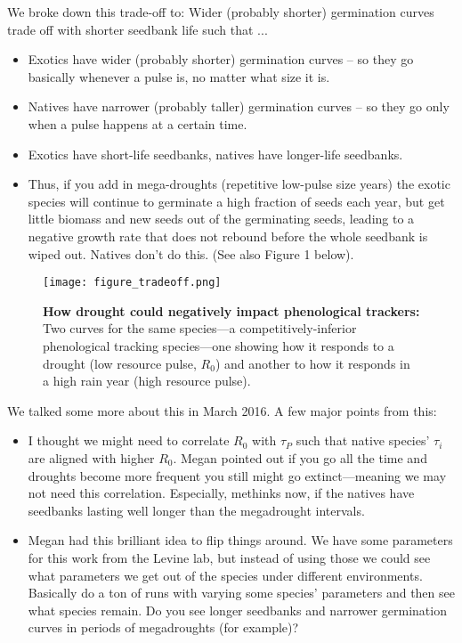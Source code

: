 \documentclass[11pt,a4paper,oneside]{article}
\newenvironment{smitemize}{
\begin{itemize}
  \setlength{\itemsep}{1pt}
  \setlength{\parskip}{0pt}
  \setlength{\parsep}{0pt}}
{\end{itemize}
}
\begin{document}
\noindent We broke down this trade-off to: Wider (probably shorter) germination curves trade off with shorter seedbank life such that ...
\begin{smitemize}
\item Exotics have wider (probably shorter) germination curves -- so they go basically whenever a pulse is, no matter what size it is.
\item Natives have narrower (probably taller) germination curves -- so they go only when a pulse happens at a certain time.
\item Exotics have short-life seedbanks, natives have longer-life seedbanks. 
\item Thus, if you add in mega-droughts (repetitive low-pulse size years) the exotic species will continue to germinate a high fraction of seeds each year, but get little biomass and new seeds out of the germinating seeds, leading to a negative growth rate that does not rebound before the whole seedbank is wiped out. Natives don't do this. (See also Figure 1 below). 
\end{smitemize}

\begin{figure}[h!]
\centering
\noindent \texttt{[image: figure\_tradeoff.png]}
\caption{{\bf How drought could negatively impact phenological trackers:} Two curves for the same species---a competitively-inferior phenological tracking species---one showing how it responds to a drought (low resource pulse, $R_0$) and another to how it responds in a high rain year (high resource pulse).} %
\end{figure}

We talked some more about this in March 2016. A few major points from this:
\begin{smitemize}
\item I thought we might need to correlate $R_0$ with $\tau_{P}$ such that native species' $\tau_{i}$ are aligned with higher $R_0$. Megan pointed out if you go all the time and droughts become more frequent you still might go extinct---meaning we may not need this correlation. Especially, methinks now, if the natives have seedbanks lasting well longer than the megadrought intervals.
\item Megan had this brilliant idea to flip things around. We have some parameters for this work from the Levine lab, but instead of using those we could see what parameters we get out of the species under different environments. Basically do a ton of runs with varying some species' parameters and then see what species remain. Do you see longer seedbanks and narrower germination curves in periods of megadroughts (for example)?
\end{smitemize}
\end{document}

